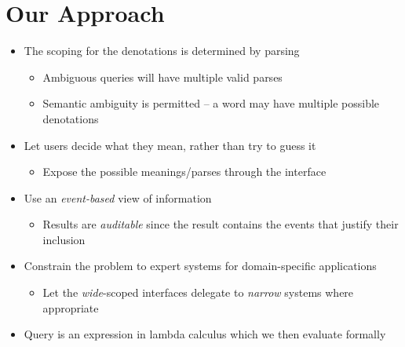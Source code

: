 \documentclass[logoontitle,tabu,supertabular,aspectratio=43]{preney-uwindsor-beamer}
\begin{document}
   \section{Our Approach}
    \begin{frame}{\insertsection}
        \begin{itemize}
            \item The scoping for the denotations is determined by parsing
            \begin{itemize}
                \item Ambiguous queries will have multiple valid parses
                \item Semantic ambiguity is permitted -- a word may have multiple possible denotations
            \end{itemize}
            \item Let users decide what they mean, rather than try to guess it
            \begin{itemize}
                \item Expose the possible meanings/parses through the interface
            \end{itemize}
            \item Use an {\em event-based} view of information \cite{frost:eswcposter2014}
            \begin{itemize}
                \item Results are {\em auditable} since the result contains the events that justify their inclusion
            \end{itemize}
            \item Constrain the problem to expert systems for domain-specific applications
            \begin{itemize}
                \item Let the {\em wide}-scoped interfaces delegate to {\em narrow} systems where appropriate
            \end{itemize}
            \item Query is an expression in lambda calculus which we then evaluate formally
        \end{itemize}
    \end{frame}

\end{document}
